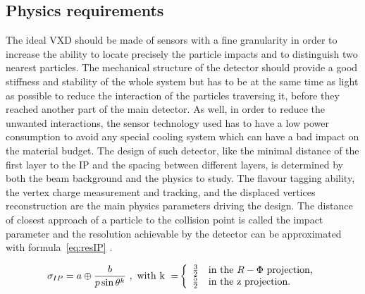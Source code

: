    \subsection{Physics requirements}
   
   The ideal \gls{VXD} should be made of sensors with a fine granularity in order to increase the ability to locate precisely the particle impacts and to distinguish two nearest particles.
   The mechanical structure of the detector should provide a good stiffness and stability of the whole system but has to be at the same time as light as possible to reduce the interaction of the particles traversing it, before they reached another part of the main detector.
   As well, in order to reduce the unwanted interactions, the sensor technology used has to have a low power consumption to avoid any special cooling system which can have a bad impact on the material budget.
   The design of such detector, like the minimal distance of the first layer to the \gls{IP} and the spacing between different layers, is determined by both the beam background and the physics to study.
   The flavour tagging ability, the vertex charge measurement and tracking, and the displaced vertices reconstruction are the main physics parameters driving the design.
   The distance of closest approach of a particle to the collision point is called the impact parameter and the resolution achievable by the detector can be approximated with formula~\ref{eq:resIP} \cite{Battaglia2011}.
    
    \begin{equation}
      \sigma_{IP} = a \oplus \frac{b}{p \sin{\theta}^{k}}~\rm{,~with~k~=}
      \left\{
        \begin{array}{r l}
          \frac{3}{2} & \text{in the } R - \Phi \text{ projection,} \\
          \frac{5}{2} & \text{in the z projection.}
        \end{array}
      \right. 
      \label{eq:resIP}
    \end{equation}

